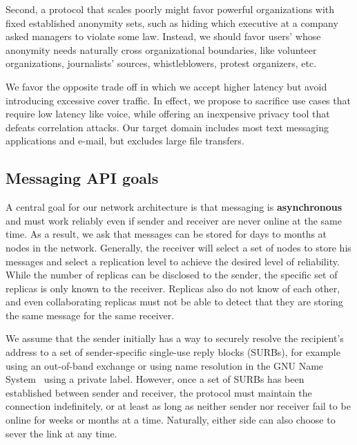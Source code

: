 \documentclass[twoside,letterpaper]{llncs}
\begin{document}
Second, a protocol that scales poorly might favor powerful
organizations with fixed established anonymity sets, such as hiding
which executive at a company asked managers to violate some law.
Instead, we should favor users' whose anonymity needs naturally
cross organizational boundaries, like volunteer organizations,
journalists' sources, whistleblowers, protest organizers, etc.

We favor the opposite trade off in which we accept higher latency but
avoid introducing excessive cover traffic. In effect, we propose to
sacrifice use cases that require low latency like voice, while
offering an inexpensive privacy tool that defeats correlation attacks.
Our target domain includes most text messaging applications and
e-mail, but excludes large file transfers.

\subsection{Messaging API goals} 

A central goal for our network architecture is that messaging is 
{\bf asynchronous} and must work reliably even if sender and receiver
are never online at the same time.  As a result, we ask that messages
can be stored for days to months at nodes in the network.  Generally,
the receiver will select a set of nodes to store his messages and
select a replication level to achieve the desired level of
reliability. While the number of replicas can be disclosed to the
sender, the specific set of replicas is only known to the receiver.
Replicas also do not know of each other, and even collaborating
replicas must not be able to detect that they are storing the same
message for the same receiver.

We assume that the sender initially has a way to securely resolve the
recipient's address to a set of sender-specific single-use reply
blocks (SURBs), for example using an out-of-band exchange or using
name resolution in the GNU Name System~\cite{gns} using a private
label.  However, once a set of SURBs has been established between
sender and receiver, the protocol must maintain the connection
indefinitely, or at least as long as neither sender nor receiver fail
to be online for weeks or months at a time.  Naturally, either side
can also choose to sever the link at any time.
\end{document}
